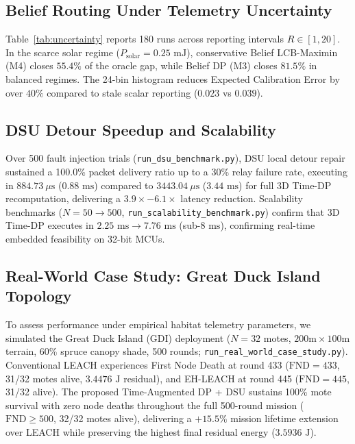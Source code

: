 \documentclass[conference]{IEEEtran}
\begin{document}
\subsection{Belief Routing Under Telemetry Uncertainty}
Table~\ref{tab:uncertainty} reports 180 runs across reporting intervals $R \in [1, 20]$. In the scarce solar regime ($P_{\text{solar}} = 0.25\text{ mJ}$), conservative Belief LCB-Maximin (M4) closes $55.4\%$ of the oracle gap, while Belief DP (M3) closes $81.5\%$ in balanced regimes. The 24-bin histogram reduces Expected Calibration Error by over $40\%$ compared to stale scalar reporting ($0.023$ vs $0.039$).

\subsection{DSU Detour Speedup and Scalability}
Over 500 fault injection trials (\texttt{run\_dsu\_benchmark.py}), DSU local detour repair sustained a 100.0\% packet delivery ratio up to a 30\% relay failure rate, executing in $884.73\ \mu\text{s}$ ($0.88\text{ ms}$) compared to $3443.04\ \mu\text{s}$ ($3.44\text{ ms}$) for full 3D Time-DP recomputation, delivering a $3.9\times - 6.1\times$ latency reduction. Scalability benchmarks ($N = 50 \to 500$, \texttt{run\_scalability\_benchmark.py}) confirm that 3D Time-DP executes in $2.25\text{ ms} \to 7.76\text{ ms}$ (sub-$8\text{ ms}$), confirming real-time embedded feasibility on 32-bit MCUs.

\subsection{Real-World Case Study: Great Duck Island Topology}
To assess performance under empirical habitat telemetry parameters, we simulated the Great Duck Island (GDI) deployment ($N=32$ motes, $200\text{m} \times 100\text{m}$ terrain, 60\% spruce canopy shade, 500 rounds; \texttt{run\_real\_world\_case\_study.py}). Conventional LEACH experiences First Node Death at round 433 ($\text{FND}=433$, 31/32 motes alive, $3.4476\text{ J}$ residual), and EH-LEACH at round 445 ($\text{FND}=445$, 31/32 alive). The proposed Time-Augmented DP + DSU sustains 100\% mote survival with zero node deaths throughout the full 500-round mission ($\text{FND} \ge 500$, 32/32 motes alive), delivering a $+15.5\%$ mission lifetime extension over LEACH while preserving the highest final residual energy ($3.5936\text{ J}$).
\end{document}
